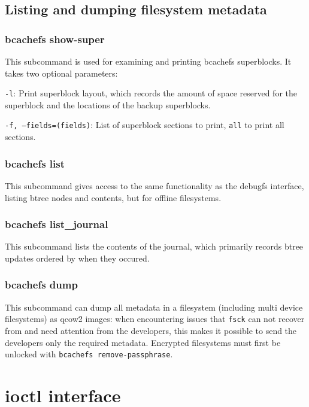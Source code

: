 \documentclass{article}
\begin{document}
\subsection{Listing and dumping filesystem metadata}

\subsubsection{bcachefs show-super}

This subcommand is used for examining and printing bcachefs superblocks. It
takes two optional parameters:
\begin{description}
	\item \texttt{-l}: Print superblock layout, which records the amount of
		space reserved for the superblock and the locations of the
		backup superblocks.
	\item \texttt{-f, --fields=(fields)}: List of superblock sections to
		print, \texttt{all} to print all sections.
\end{description}

\subsubsection{bcachefs list}

This subcommand gives access to the same functionality as the debugfs interface,
listing btree nodes and contents, but for offline filesystems.

\subsubsection{bcachefs list\_journal}

This subcommand lists the contents of the journal, which primarily records btree
updates ordered by when they occured.

\subsubsection{bcachefs dump}

This subcommand can dump all metadata in a filesystem (including multi device
filesystems) as qcow2 images: when encountering issues that \texttt{fsck} can
not recover from and need attention from the developers, this makes it possible
to send the developers only the required metadata. Encrypted filesystems must
first be unlocked with \texttt{bcachefs remove-passphrase}.

\section{ioctl interface}
\end{document}
